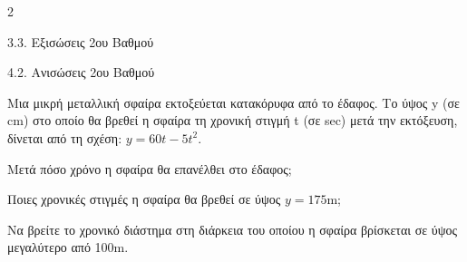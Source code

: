 \begin{ylh}{2}
    \item 3.3. Εξισώσεις 2ου Βαθμού
    \item 4.2. Ανισώσεις 2ου Βαθμού
\end{ylh}
Μια μικρή μεταλλική σφαίρα εκτοξεύεται κατακόρυφα από το έδαφος. Το ύψος y (σε cm) στο οποίο θα βρεθεί η σφαίρα τη χρονική στιγμή t (σε sec) μετά την εκτόξευση, δίνεται από τη σχέση: $y = 60t - 5t^2$.

\begin{alist}
\item Μετά πόσο χρόνο η σφαίρα θα επανέλθει στο έδαφος;
\item Ποιες χρονικές στιγμές η σφαίρα θα βρεθεί σε ύψος $y = 175\text{m}$;

\item Να βρείτε το χρονικό διάστημα στη διάρκεια του οποίου η σφαίρα βρίσκεται σε ύψος μεγαλύτερο από 100m.

\end{alist}

